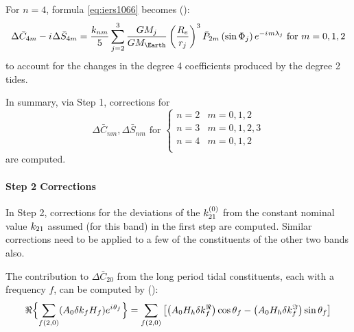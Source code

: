 For $n=4$, formula \autoref{eq:iers1066} becomes (\cite{iers2010}):
\begin{equation}
\Delta \bar{C}_{4m} - \iim \Delta \bar{S}_{4m} = \frac{\lovek _{nm}}{5}
  \sum^{3}_{j=2} \frac{GM_j}{GM_\Earth} \left( \frac{R_e}{r_j} \right) ^{3} 
  \bar{P}_{2m} \left( \sin \Phi _j \right) e^{-\iim m \lambda _j} \text{ for } m=0,1,2
  \label{eq:iers1067}
\end{equation}
to account for the changes in the degree 4 coefficients produced by the 
degree 2 tides.

In summary, via Step 1, corrections for 
\begin{equation}
  \Delta \bar{C}_{nm}, \Delta \bar{S}_{nm} \text{ for }
    \begin{cases}
      n=2 & m=0,1,2 \\
      n=3 & m=0,1,2,3 \\
      n=4 & m=0,1,2\\
    \end{cases}
\end{equation} 
are computed.

\paragraph{Step 2 Corrections}\label{par:step2-corr-earth-tides}
In Step 2, corrections for the deviations of the $k ^{(0)}_{21}$ from the 
constant nominal value $k _{21}$ assumed (for this band) in the first step 
are computed. Similar corrections need to be applied to a few of the constituents 
of the other two bands also.

The contribution to $\Delta \bar{C}_{20}$ from the long period tidal 
constituents, each with a frequency $f$, can be computed by (\cite{iers2010}):
\begin{equation}
  \Re \Bigl\{ \sum _{f(2,0)}(A_0 \delta k_f H_f) e^{{i\mkern1mu} \theta _f} \Bigr\} = 
    \sum_{f(2,0)} \left[ \left(A_0 H_h \delta k^\Re _f \right) \cos \theta _f 
      - \left(A_0 H_h \delta k^\Im _f \right) \sin \theta _f 
    \right]
  \label{eq:iers1068a}
\end{equation}

